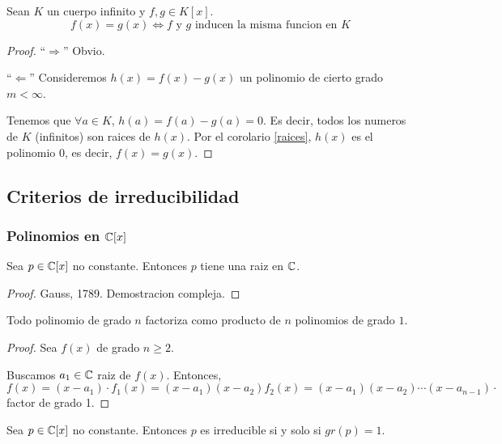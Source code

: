 \begin{corollary}
	Sean \(K \) un cuerpo infinito y \(f,g \in K[x ]\).
	\[
		f(x) = g(x) \iff f \text{ y } g \text{ inducen la misma funcion en }K
	\]
\end{corollary}
\begin{proof}
	``\(\Rightarrow \)'' Obvio.
	
	``\(\Leftarrow \)'' Consideremos \(h(x) = f(x) - g(x )\) un polinomio de cierto grado \(m < \infty \).
	
	Tenemos que \(\forall a \in K \), \(h(a) = f(a) - g(a) = 0 \). Es decir, todos los numeros de \(K \) (infinitos) son raices de \(h(x)\). Por el corolario \ref{raices}, \(h(x) \) es el polinomio \(0 \), es decir, \(f(x) = g(x )\).
\end{proof}

\subsection{Criterios de irreducibilidad}
\subsubsection{Polinomios en \(\mathbb{C}[x ]\)}
\begin{theorem}
	Sea \(p \in \mathbb{C}[x ]\) no constante. Entonces \(p \) tiene una raiz en \(\mathbb{C} \).
\end{theorem}
\begin{proof}
	Gauss, 1789. Demostracion compleja.
\end{proof}

\begin{corollary}
	Todo polinomio de grado \(n \) factoriza como producto de \(n \) polinomios de grado \(1 \).
\end{corollary}
\begin{proof}
	Sea \(f(x )\) de grado \(n \geq  2 \).
	
	Buscamos \(a_1 \in \mathbb{C} \) raiz de \(f(x )\). Entonces, \(f(x) = (x - a_1) \cdot f_1(x) = (x-a_1) (x-a_2) f_2 (x) = (x - a_1) (x - a_2) \cdots (x - a_{n-1}) \cdot \) factor de grado 1.
\end{proof}
\begin{corollary}
	Sea \(p \in \mathbb{C}[x ]\) no constante. Entonces \(p \) es irreducible si y solo si \(gr(p) = 1 \).
\end{corollary}

